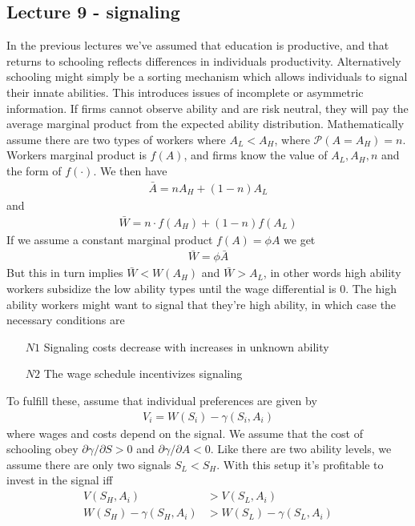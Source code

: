 \documentclass[12pt, a4paper]{article}
\begin{document}
\begin{multicols}{2}
\subsection{Lecture 9 - signaling}
In the previous lectures we've assumed that education is productive, and that returns to schooling reflects differences in individuals productivity. Alternatively schooling might simply be a sorting mechanism which allows individuals to signal their innate abilities. This introduces issues of incomplete or asymmetric information. If firms cannot observe ability and are risk neutral, they will pay the average marginal product from the expected ability distribution. Mathematically assume there are two types of workers where $A_L < A_H$, where $\mathcal{P}(A=A_H)=n$. Workers marginal product is $f(A)$, and firms know the value of $A_L,A_H, n$ and the form of $f(\cdot)$. We then have
\begin{align*}
\bar{A} = nA_H + (1-n) A_L
\end{align*}
and 
\begin{align*}
\bar{W} = n \cdot f(A_H) +(1-n)f(A_L)
\end{align*}
If we assume a constant marginal product $f(A) = \phi A$ we get
\begin{align*}
\bar{W} = \phi \bar{A}
\end{align*}
But this in turn implies $\bar{W}<W(A_H)$ and $\bar{W}>A_L$, in other words high ability workers subsidize the low ability types until the wage differential is 0. The high ability workers might want to signal that they're high ability, in which case the necessary conditions are 
\begin{itemize}
\item[$N1$] Signaling costs decrease with increases in unknown ability
\item[$N2$] The wage schedule incentivizes signaling
\end{itemize}
To fulfill these, assume that individual preferences are given by
\begin{align*}
V_i = W(S_i)-\gamma(S_i,A_i)
\end{align*}
where wages and costs depend on the signal. We assume that the cost of schooling obey $\partial \gamma /\partial S>0$ and $\partial \gamma /\partial A<0$. Like there are two ability levels, we assume there are only two signals $S_L<S_H$. With this setup it's profitable to invest in the signal iff 
\begin{align*}
V(S_H,A_i)&>V(S_L,A_i) \\
W(S_H)-\gamma(S_H,A_i)&>W(S_L)-\gamma(S_L,A_i)

\end{align*}
\end{multicols}
\end{document}
